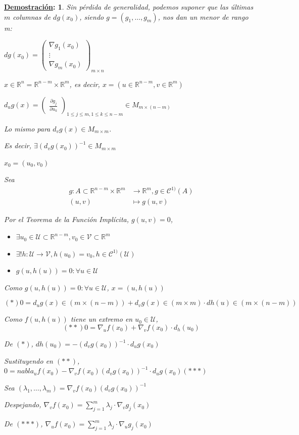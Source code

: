 \documentclass[10pt,a4paper,openright]{book}
\theoremstyle{break}
\newtheorem*{demo}{\underline{Demostración}:}
\begin{document}
\begin{demo}
Sin pérdida de generalidad, podemos suponer que las últimas $m$ columnas de $dg(x_0)$, siendo $g = (g_1, \ldots, g_m)$, nos dan un menor de rango m:

$dg(x_0) = \begin{pmatrix}
\nabla g_1 (x_0) \\ \vdots \\ \nabla g_m (x_0) 
\end{pmatrix}_{m \times n}$

$x \in \mathbb{R}^n = \mathbb{R}^{n-m} \times \mathbb{R}^m$, es decir, $x = (u \in \mathbb{R}^{n-m} ,v \in \mathbb{R}^m)$

$d_u g(x) = \begin{pmatrix}
\frac{\partial g_j}{\partial u_k}
\end{pmatrix}_{1 \leq j \leq m, 1 \leq k \leq n - m} \in M_{m \times (n-m)}$

Lo mismo para $d_v g(x) \in M_{m \times m}$.

Es decir, $\exists (d_v g(x_0))^{-1} \in M_{m \times m}$

$x_0 = (u_0, v_0)$

Sea \begin{align*}
g : A \subset \mathbb{R}^{n-m} \times \mathbb{R}^m &\to \mathbb{R}^m, g \in \mathcal{C}^{1)}(A) \\ (u,v) &\mapsto g(u,v)
\end{align*}

Por el Teorema de la Función Implícita, $g(u,v) = 0$,
\begin{itemize}
\item $\exists u_0 \in \mathcal{U} \subset \mathbb{R}^{n-m}, v_0 \in \mathcal{V} \subset \mathbb{R}^m$
\item $\exists ! h : \mathcal{U} \to \mathcal{V}, h(u_0) = v_0, h \in \mathcal{C}^{1)} (\mathcal{U})$
\item $g(u, h(u)) = 0 : \forall u \in \mathcal{U}$
\end{itemize}

Como $g(u, h(u)) = 0 : \forall u \in \mathcal{U}$, $x = (u, h(u))$

$$(*)0 = d_u g(x) \in (m \times (n - m)) + d_v g(x) \in (m \times m) \cdot dh(u) \in (m \times (n - m)) $$

Como $f(u, h(u))$ tiene un extremo en $u_0 \in \mathcal{U}$,
$$(**)0 = \nabla_u f(x_0) + \nabla_v f(x_0) \cdot d_h(u_0)$$

De $(*)$, $dh(u_0) = - (d_v g(x_0))^{-1} \cdot d_u g(x_0)$

Sustituyendo en $(**)$, $0 = nabla_u f(x_0) - \nabla_v f(x_0) \left( d_v g(x_0) \right)^{-1} \cdot d_u g(x_0) (***)$

Sea $(\lambda_1, \ldots, \lambda_m) = \nabla_v f(x_0) \left( d_v g(x_0) \right)^{-1}$

Despejando, $\nabla_v f(x_0) = \sum_{j = 1}^{m} \lambda_j \cdot \nabla_v g_j (x_0)$

De $(***)$, $\nabla_u f(x_0) = \sum_{j = 1}^{m} \lambda_j \cdot \nabla_u g_j (x_0)$
\end{demo}
\end{document}
